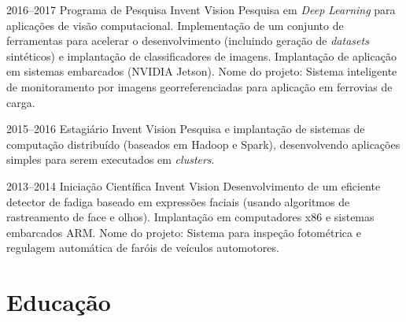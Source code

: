 \documentclass[a4paper]{cv-friggeri-x}
\begin{document}
\begin{entrylist}

\entry
    {2016--2017}
    {Programa de Pesquisa}%
    {Invent Vision}
    {Pesquisa em \textit{Deep Learning} para aplicações de visão computacional. Implementação de um conjunto de ferramentas para acelerar o desenvolvimento (incluindo geração de \textit{datasets} sintéticos) e implantação de classificadores de imagens. Implantação de aplicação em sistemas embarcados (NVIDIA Jetson). Nome do projeto: Sistema inteligente de monitoramento por imagens georreferenciadas para aplicação em ferrovias de carga.}

\entry
    {2015--2016}
    {Estagiário}
    {Invent Vision}
    {Pesquisa e implantação de sistemas de computação distribuído (baseados em Hadoop e Spark), desenvolvendo aplicações simples para serem executados em \textit{clusters}.}

\entry
    {2013--2014}
    {Iniciação Científica}
    {Invent Vision}
    {Desenvolvimento de um eficiente detector de fadiga baseado em expressões faciais (usando algoritmos de rastreamento de face e olhos). Implantação em computadores x86 e sistemas embarcados ARM. Nome do projeto: Sistema para inspeção fotométrica e regulagem automática de faróis de veículos automotores.}



\end{entrylist}


\section{Educação}
\end{document}
